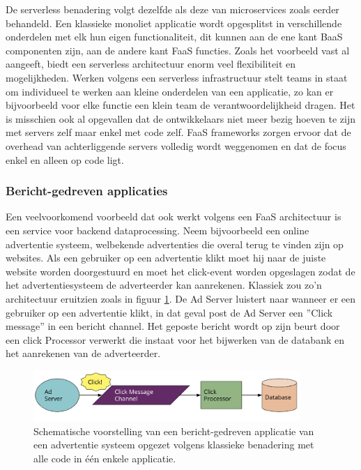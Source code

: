 De serverless benadering volgt dezelfde als deze van microservices zoals eerder behandeld. Een klassieke monoliet applicatie wordt opgesplitst in verschillende onderdelen met elk hun eigen functionaliteit, dit kunnen aan de ene kant BaaS componenten zijn, aan de andere kant FaaS functies. Zoals het voorbeeld vast al aangeeft, biedt een serverless architectuur enorm veel flexibiliteit en mogelijkheden. Werken volgens een serverless infrastructuur stelt teams in staat om individueel te werken aan kleine onderdelen van een applicatie, zo kan er bijvoorbeeld voor elke functie een klein team de verantwoordelijkheid dragen. Het is misschien ook al opgevallen dat de ontwikkelaars niet meer bezig hoeven te zijn met servers zelf maar enkel met code zelf. FaaS frameworks zorgen ervoor dat de overhead van achterliggende servers volledig wordt weggenomen en dat de focus enkel en alleen op code ligt.

\newpage
\subsubsection{Bericht-gedreven applicaties}
Een veelvoorkomend voorbeeld dat ook werkt volgens een FaaS architectuur is een service voor backend dataprocessing. Neem bijvoorbeeld een online advertentie systeem, welbekende advertenties die overal terug te vinden zijn op websites. Als een gebruiker op een advertentie klikt moet hij naar de juiste website worden doorgestuurd en moet het click-event worden opgeslagen zodat de het advertentiesysteem de adverteerder kan aanrekenen.
Klassiek zou zo'n architectuur eruitzien zoals in figuur \ref{fig:klassiek-message-driven}. De Ad Server luistert naar wanneer er een gebruiker op een advertentie klikt, in dat geval post de Ad Server een ''Click message'' in een bericht channel. Het geposte bericht wordt op zijn beurt door een click Processor verwerkt die instaat voor het bijwerken van de databank en het aanrekenen van de adverteerder.
\begin{figure}
    \centering
    \includegraphics[width=0.9\textwidth]{img/klassiek_message_driven.png}
    \caption{Schematische voorstelling van een bericht-gedreven applicatie van een advertentie systeem opgezet volgens klassieke benadering met alle code in één enkele applicatie. \autocite{Roberts2018}} 
    \label{fig:klassiek-message-driven}  
\end{figure}

